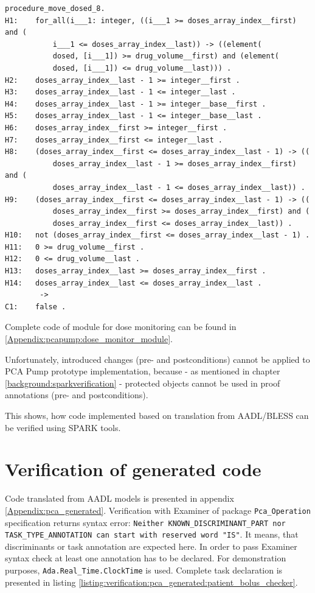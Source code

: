 \singlespacing
\begin{lstlisting}[frame=single, gobble=0, caption={Dead path in \lstinline{Move_Dosed} procedure}]
procedure_move_dosed_8.
H1:    for_all(i___1: integer, ((i___1 >= doses_array_index__first) and (
           i___1 <= doses_array_index__last)) -> ((element(
           dosed, [i___1]) >= drug_volume__first) and (element(
           dosed, [i___1]) <= drug_volume__last))) .
H2:    doses_array_index__last - 1 >= integer__first .
H3:    doses_array_index__last - 1 <= integer__last .
H4:    doses_array_index__last - 1 >= integer__base__first .
H5:    doses_array_index__last - 1 <= integer__base__last .
H6:    doses_array_index__first >= integer__first .
H7:    doses_array_index__first <= integer__last .
H8:    (doses_array_index__first <= doses_array_index__last - 1) -> ((
           doses_array_index__last - 1 >= doses_array_index__first) and (
           doses_array_index__last - 1 <= doses_array_index__last)) .
H9:    (doses_array_index__first <= doses_array_index__last - 1) -> ((
           doses_array_index__first >= doses_array_index__first) and (
           doses_array_index__first <= doses_array_index__last)) .
H10:   not (doses_array_index__first <= doses_array_index__last - 1) .
H11:   0 >= drug_volume__first .
H12:   0 <= drug_volume__last .
H13:   doses_array_index__last >= doses_array_index__first .
H14:   doses_array_index__last <= doses_array_index__last .
        ->
C1:    false .
\end{lstlisting}
\label{listing:pcapump_dosemonitor:dead_path}
\doublespacing

Complete code of module for dose monitoring can be found in \ref{Appendix:pcapump:dose_monitor_module}.

Unfortunately, introduced changes (pre- and postconditions) cannot be applied to PCA Pump prototype implementation, because - as mentioned in chapter \ref{background:sparkverification} - protected objects cannot be used in proof annotations (pre- and postconditions).

This shows, how code implemented based on translation from AADL/BLESS can be verified using SPARK tools.



\section{Verification of generated code}
\label{verification:generated}

Code translated from AADL models is presented in appendix \ref{Appendix:pca_generated}. Verification with Examiner of package \lstinline{Pca_Operation} specification returns syntax error: \lstinline{Neither KNOWN_DISCRIMINANT_PART nor TASK_TYPE_ANNOTATION can start with reserved word "IS"}. It means, that discriminants or task annotation are expected here. In order to pass Examiner syntax check at least one annotation has to be declared. For demonstration purposes, \lstinline{Ada.Real_Time.ClockTime} is used. Complete task declaration is presented in listing \ref{listing:verification:pca_generated:patient_bolus_checker}.

